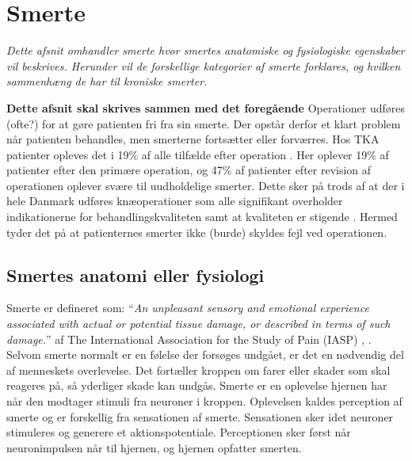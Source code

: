 \section{Smerte}
\textit{Dette afsnit omhandler smerte hvor smertes anatomiske og fysiologiske egenskaber vil beskrives. Herunder vil de forskellige kategorier af smerte forklares, og hvilken sammenhæng de har til kroniske smerter.}

\textbf{Dette afsnit skal skrives sammen med det foregående}
Operationer udføres (ofte?) for at gøre patienten fri fra sin smerte. Der opstår derfor et klart problem når patienten behandles, men smerterne fortsætter eller forværres. Hos TKA patienter opleves det i 19\% af alle tilfælde efter operation \citep{Petersen2015}. Her oplever 19\% af patienter efter den primære operation, og 47\% af patienter efter revision af operationen oplever svære til uudholdelige smerter. Dette sker på trods af at der i hele Danmark udføres knæoperationer som alle signifikant overholder indikationerne for behandlingskvaliteten samt at kvaliteten er stigende \citep{aarsrapport2016}. Hermed tyder det på at patienternes smerter ikke (burde) skyldes fejl ved operationen.


\subsection{Smertes anatomi eller fysiologi}

Smerte er defineret som: “\textit{An unpleasant sensory and emotional experience associated with actual or potential tissue damage, or described in terms of such damage.}” af The International Association for the Study of Pain (IASP) \citep{Giangregorio1997}, \citep{Carmon}.\\
Selvom smerte normalt er en følelse der forsøges undgået, er det en nødvendig del af menneskets overlevelse. Det fortæller kroppen om farer eller skader som skal reageres på, så yderliger skade kan undgås.
Smerte er en oplevelse hjernen har når den modtager stimuli fra neuroner i kroppen. Oplevelsen kaldes perception af smerte og er forskellig fra sensationen af smerte. Sensationen sker idet neuroner stimuleres og generere et aktionspotentiale. Perceptionen sker først når neuronimpulsen når til hjernen, og hjernen opfatter smerten. 


